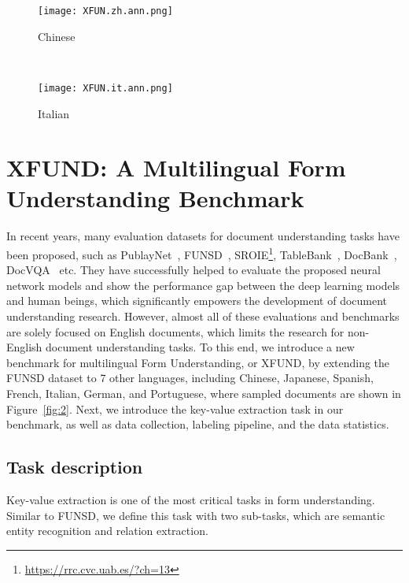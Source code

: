 \documentclass[11pt]{article}
\newcommand{\task}{\textsc{XFUND}\xspace}
\begin{document}
\begin{figure*}[t]
	\centering
\begin{subfigure}[b]{0.4\textwidth}
		\texttt{[image: XFUN.zh.ann.png]}
		\caption{Chinese}
		\label{fig:1b}
	\end{subfigure}
	~ \begin{subfigure}[b]{0.4\textwidth}
		\texttt{[image: XFUN.it.ann.png]}
		\caption{Italian}
		\label{fig:1d}
	\end{subfigure}
\caption{Two sampled forms from the \task benchmark dataset (Chinese and Italian), where {\color{red} red} denotes the headers, {\color{green} green} denotes the keys and {\color{blue} blue} denotes the values.}\label{fig:2}
\end{figure*}


\section{\task: A Multilingual Form Understanding Benchmark}

In recent years, many evaluation datasets for document understanding tasks have been proposed, such as PublayNet~\cite{zhong2019publaynet}, FUNSD~\cite{Jaume_2019}, SROIE\footnote{\url{https://rrc.cvc.uab.es/?ch=13}},  TableBank~\cite{li-etal-2020-tablebank}, DocBank~\cite{li-etal-2020-docbank}, DocVQA~\cite{mathew2020docvqa} etc. They have successfully helped to evaluate the proposed neural network models and show the performance gap between the deep learning models and human beings, which significantly empowers the development of document understanding research. However, almost all of these evaluations and benchmarks are solely focused on English documents, which limits the research for non-English document understanding tasks. To this end, we introduce a new benchmark for multilingual Form Understanding, or \task, by extending the FUNSD dataset to 7 other languages, including Chinese, Japanese, Spanish, French, Italian, German, and Portuguese, where sampled documents are shown in Figure~\ref{fig:2}. Next, we introduce the key-value extraction task in our benchmark, as well as data collection, labeling pipeline, and the data statistics. 


\subsection{Task description}
Key-value extraction is one of the most critical tasks in form understanding. Similar to FUNSD, we define this task with two sub-tasks, which are semantic entity recognition and relation extraction.
\end{document}
